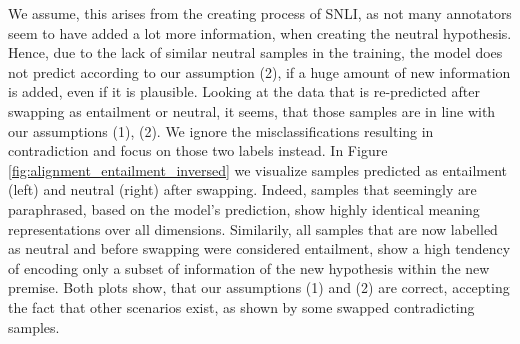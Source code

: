 We assume, this arises from the creating process of \ac{SNLI}, as not many annotators seem to have added a lot more information, when creating the neutral hypothesis. Hence, due to the lack of similar neutral samples in the training, the model does not predict according to our assumption (2), if a huge amount of new information is added, even if it is plausible. Looking at the data that is re-predicted after swapping as entailment or neutral, it seems, that those samples are in line with our assumptions (1), (2). We ignore the misclassifications resulting in contradiction and focus on those two labels instead. In Figure \ref{fig:alignment_entailment_inversed} we visualize samples predicted as entailment (left) and neutral (right) after swapping. Indeed, samples that seemingly are paraphrased, based on the model's prediction, show highly identical meaning representations over all dimensions. Similarily, all samples that are now labelled as neutral and before swapping were considered entailment, show a high tendency of encoding only a subset of information of the new hypothesis within the new premise. Both plots show, that our assumptions (1) and (2) are correct, accepting the fact that other scenarios exist, as shown by some swapped contradicting samples.
